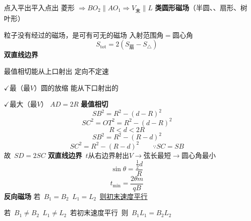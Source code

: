 点入平出\quad 平入点出
菱形 $\Rightarrow BO_2\parallel AO_1\Rightarrow V_{\text{末}}\parallel L$
\textbf{类圆形磁场}（半圆、、扇形、树叶形）

粒子没有经过的磁场，是可有可无的磁场
入射范围角$=$圆心角
\[ S_{\mathrm{tot}}=2\left(S_{\text{扇}}-S_{\triangle}\right) \]
\textbf{双直线边界}

最值相切\quad 能从上口射出
定向不定速

$\checkmark$最（最$V$）\quad 圆的放缩
能从下口射出的

$\checkmark$最大（最$V$）
$AD=2R$
\textbf{最值相切}
\[ SB^2=R^2-(d-R)^2 \]
\[ SC^2=OT^2=R^2-(d-R)^2 \]
\[ R<d<2R \]
\[ SB^2=R^2-(R-d)^2 \]
\[ SC^2=R^2-(R-d)^2 \qquad \because SC=SB \]
故\ $SD=2SC$
\textbf{双直线边界}\ $t$\quad 从右边界射出\quad $V$$\to$弦长最短$\to$圆心角最小
\[ \sin\theta=\frac{\frac12 d}{R} \]
\[ t_{\min}=\frac{2\theta m}{qB} \]
\textbf{反向磁场}
若\ $B_1=B_2$\ $L_1=L_2$\ \underline{则初末速度平行}

若\ $B_1\ne B_2$\ $L_1\ne L_2$\ 若初末速度平行\ 则\ \underline{$B_1L_1=B_2L_2$}

